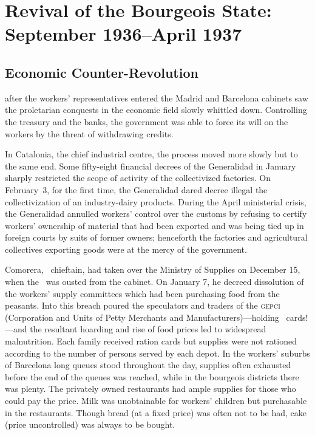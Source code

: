 \chapter[Revival of the Bourgeois State]{Revival of the Bourgeois State: September 1936--April 1937}

\section{Economic Counter-Revolution}

 after the workers’ representatives entered the Madrid and Barcelona cabinets saw the proletarian conquests in the economic field slowly whittled down. Controlling the treasury and the banks, the government was able to force its will on the workers by the threat of withdrawing credits.

In Catalonia, the chief industrial centre, the process moved more slowly but to the same end. Some fifty-eight financial decrees of the Generalidad in January sharply restricted the scope of activity of the collectivized factories. On February~3, for the first time, the Generalidad dared decree illegal the collectivization of an industry-dairy products. During the April ministerial crisis, the Generalidad annulled workers’ control over the customs by refusing to certify workers’ ownership of material that had been exported and was being tied up in foreign courts by suits of former owners; henceforth the factories and agricultural collectives exporting goods were at the mercy of the government.

Comorera, \PSUC\ chieftain, had taken over the Ministry of Supplies on December 15, when the \POUM\ was ousted from the cabinet. On January 7, he decreed dissolution of the workers’ supply committees which had been purchasing food from the peasants. Into this breach poured the speculators and traders of the \textsc{gepci} (Corporation and Units of Petty Merchants and Manufacturers)---holding \UGT\ cards!---and the resultant hoarding and rise of food prices led to widespread malnutrition. Each family received ration cards but supplies were not rationed according to the number of persons served by each depot. In the workers’ suburbs of Barcelona long queues stood throughout the day, supplies often exhausted before the end of the queues was reached, while in the bourgeois districts there was plenty. The privately owned restaurants had ample supplies for those who could pay the price. Milk was unobtainable for workers’ children but purchasable in the restaurants. Though bread (at a fixed price) was often not to be had, cake (price uncontrolled) was always to be bought.

